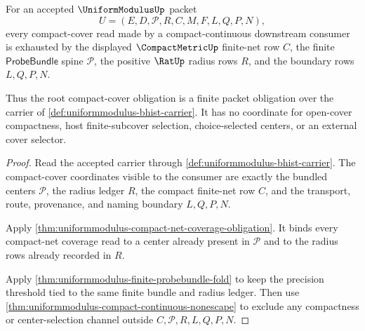 \begin{theorem}
\label{thm:uniformmodulus-root-compact-cover-row-totality}
For an accepted $\UniformModulusUp$ packet
$$
U=(E,D,\mathcal{P},R,C,M,F,L,Q,P,N),
$$
every compact-cover read made by a compact-continuous downstream consumer is exhausted by the displayed $\CompactMetricUp$ finite-net row $C$, the finite $\mathsf{ProbeBundle}$ spine $\mathcal{P}$, the positive $\RatUp$ radius rows $R$, and the boundary rows $L,Q,P,N$.

Thus the root compact-cover obligation is a finite packet obligation over the carrier of \autoref{def:uniformmodulus-bhist-carrier}. It has no coordinate for open-cover compactness, host finite-subcover selection, choice-selected centers, or an external cover selector.
\end{theorem}
\begin{proof}
Read the accepted carrier through \autoref{def:uniformmodulus-bhist-carrier}. The compact-cover coordinates visible to the consumer are exactly the bundled centers $\mathcal{P}$, the radius ledger $R$, the compact finite-net row $C$, and the transport, route, provenance, and naming boundary $L,Q,P,N$.

Apply \autoref{thm:uniformmodulus-compact-net-coverage-obligation}. It binds every compact-net coverage read to a center already present in $\mathcal{P}$ and to the radius rows already recorded in $R$.

Apply \autoref{thm:uniformmodulus-finite-probebundle-fold} to keep the precision threshold tied to the same finite bundle and radius ledger. Then use \autoref{thm:uniformmodulus-compact-continuous-nonescape} to exclude any compactness or center-selection channel outside $C,\mathcal{P},R,L,Q,P,N$.
\end{proof}

